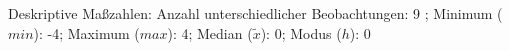 				\label{tableValues:cski02f}
				\vspace*{-\baselineskip}
                    \begin{noten}
                	    \note{} Deskriptive Maßzahlen:
                	    Anzahl unterschiedlicher Beobachtungen: 9%
                	    ; 
                	      Minimum ($min$): -4; 
                	      Maximum ($max$): 4; 
                	      Median ($\tilde{x}$): 0; 
                	      Modus ($h$): 0
                     \end{noten}


